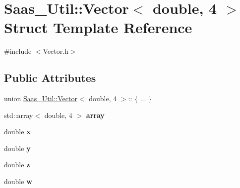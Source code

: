\hypertarget{struct_saas___util_1_1_vector_3_01double_00_014_01_4}{}\section{Saas\+\_\+\+Util\+:\+:Vector$<$ double, 4 $>$ Struct Template Reference}
\label{struct_saas___util_1_1_vector_3_01double_00_014_01_4}


{\ttfamily \#include $<$Vector.\+h$>$}

\subsection*{Public Attributes}
\begin{DoxyCompactItemize}
\item 
\hypertarget{struct_saas___util_1_1_vector_3_01double_00_014_01_4_a2b0c284709fc5686b6b23eee99559877}{}union \hyperlink{class_saas___util_1_1_vector}{Saas\+\_\+\+Util\+::\+Vector}$<$ double, 4 $>$\+:: \{ ... \}  \label{struct_saas___util_1_1_vector_3_01double_00_014_01_4_a2b0c284709fc5686b6b23eee99559877}

\item 
\hypertarget{struct_saas___util_1_1_vector_3_01double_00_014_01_4_a1f83abd82c995a27373f948ae473960a}{}std\+::array$<$ double, 4 $>$ {\bfseries array}\label{struct_saas___util_1_1_vector_3_01double_00_014_01_4_a1f83abd82c995a27373f948ae473960a}

\item 
\hypertarget{struct_saas___util_1_1_vector_3_01double_00_014_01_4_a468462d9f96bac50d17514da26ca0297}{}double {\bfseries x}\label{struct_saas___util_1_1_vector_3_01double_00_014_01_4_a468462d9f96bac50d17514da26ca0297}

\item 
\hypertarget{struct_saas___util_1_1_vector_3_01double_00_014_01_4_ad7322e304fd154d043240d9a914b9325}{}double {\bfseries y}\label{struct_saas___util_1_1_vector_3_01double_00_014_01_4_ad7322e304fd154d043240d9a914b9325}

\item 
\hypertarget{struct_saas___util_1_1_vector_3_01double_00_014_01_4_ad88014cfee38ec40e4d78f6bffaf4a97}{}double {\bfseries z}\label{struct_saas___util_1_1_vector_3_01double_00_014_01_4_ad88014cfee38ec40e4d78f6bffaf4a97}

\item 
\hypertarget{struct_saas___util_1_1_vector_3_01double_00_014_01_4_a1f2759dfbb46508f2414cc3a95c68787}{}double {\bfseries w}\label{struct_saas___util_1_1_vector_3_01double_00_014_01_4_a1f2759dfbb46508f2414cc3a95c68787}

\end{DoxyCompactItemize}


